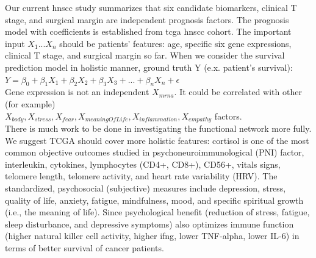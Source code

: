 \documentclass[jpm,article,submit,moreauthors,pdftex]{Definitions/mdpi}
\begin{document}
\begin{paracol}{2}
Our current \acrshort{hnscc} study summarizes that six candidate biomarkers, clinical T stage, and surgical margin are independent prognosis factors.
The prognosis model with coefficients is established from \acrshort{tcga} \acrshort{hnscc} cohort. The important input $X_1...X_n$ should be patients' features: age, specific six gene expressions, clinical T stage, and surgical margin so far.
When we consider the survival prediction model in holistic manner,
ground truth Y (e.x. patient's survival):\\[0.5cm]
$Y = \beta_0 + \beta_1 X_1 + \beta_2 X_2 + \beta_3 X_3 + ... + \beta_n X_n + \epsilon$\\[0.5cm]
Gene expression is not an independent $X_{mrna}$. It could be correlated with other (for example)\\ $X_{body}, X_{stress}, X_{fear}, X_{meaningOfLife}, X_{inflammation}, X_{empathy}$ factors.\\
There is much work to be done in investigating the functional network more fully\cite{Rogers1959}.
We suggest TCGA should cover more holistic features:
cortisol is one of the most common objective outcomes studied in psychoneuroimmunological (PNI) factor, interleukin, cytokines, lymphocytes (CD4+, CD8+), CD56+, vitals signs, telomere length, telomere activity, and heart rate variability (HRV).
The standardized, psychosocial (subjective) measures include depression, stress, quality of life, anxiety, fatigue, mindfulness, mood, and specific spiritual growth (i.e., the meaning of life)\cite{Hsiao2012}.
Since psychological benefit (reduction of stress, fatigue, sleep disturbance, and depressive symptoms) also optimizes immune function (higher natural killer cell activity, higher \acrshort{ifng}, lower TNF-alpha, lower IL-6) in terms of better survival of cancer patients.


\end{paracol}
\end{document}
